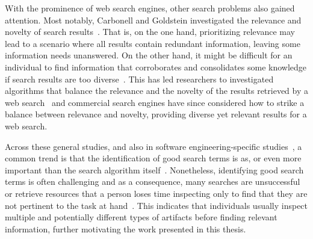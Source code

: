 With the prominence of web search engines, other search problems also gained attention.
Most notably,  Carbonell and Goldstein investigated the relevance and novelty of search results~\cite{Carbonell1998}.
That is, on the one hand, prioritizing relevance may lead to a scenario where all results contain redundant information, leaving some information needs unanswered. 
On the other hand, it might be difficult for an individual 
to find information that corroborates and consolidates some knowledge if search results are too diverse~\cite{clark2013relevance}.  
This has led researchers to investigated 
algorithms that balance the relevance and the novelty of the results retrieved
by a web search~\cite{najork2001, rafiei2010, vieira2011}
and commercial search engines have since considered how to strike a balance
between relevance and novelty, providing diverse  
yet relevant results for a web search.





Across these general studies, and also in software engineering-specific studies~\cite{Starke2009, Brandt2009a, DeGraaf2014},
a common trend is that the identification of good search terms is as, or even more
important than the search algorithm itself~\cite{Kevic2014}. 
Nonetheless, identifying good search terms is often challenging and 
as a consequence, many searches are unsuccessful or retrieve resources that 
a person loses time inspecting only to find that they are not pertinent to the task at hand~\cite{novotny2004don, Haiduc2013}.
This indicates that individuals usually inspect multiple and potentially different types of artifacts 
before finding relevant information, further motivating
the work presented in this thesis.





